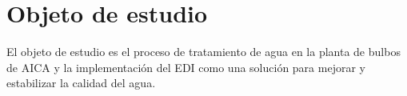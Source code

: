 \section*{Objeto de estudio}
El objeto de estudio es el proceso de tratamiento de agua en la planta de bulbos de AICA y la implementación del EDI como una solución para mejorar y estabilizar la calidad del agua.